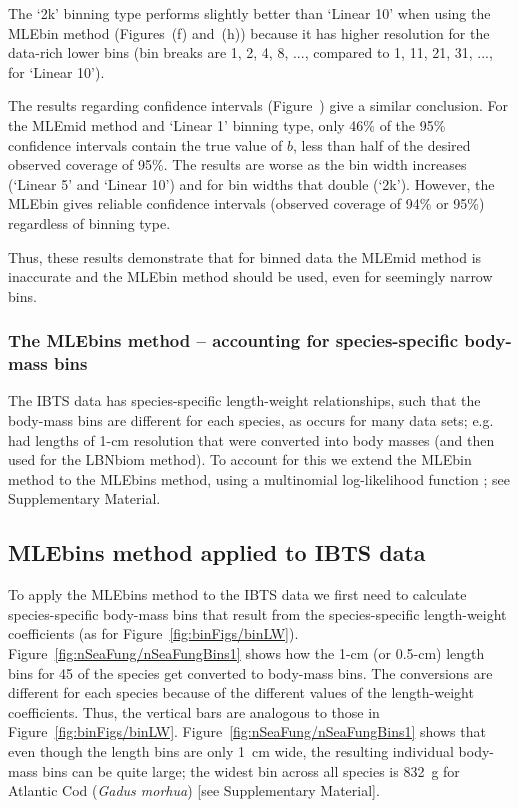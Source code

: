 The `2k' binning type performs slightly better than `Linear 10' when using the
MLEbin method (Figures~\fitMLEhists(f) and~(h)) because it has higher resolution
for the data-rich lower bins (bin breaks are 1, 2, 4, 8, ..., compared to 1, 11,
21, 31, ..., for `Linear 10').

The results regarding confidence intervals (Figure~\fitMLEconfs) give a similar
conclusion. For the MLEmid method and `Linear 1' binning type, only 46\% of the
95\% confidence intervals contain the true value of $b$, less than half of the
desired observed coverage of 95\%. The results are worse as the bin width
increases (`Linear 5' and `Linear 10') and for bin widths that double
(`2k'). However, the MLEbin gives reliable confidence intervals (observed
coverage of 94\% or 95\%) regardless of binning type.

Thus, these results demonstrate that for binned data the MLEmid method is
inaccurate and the MLEbin method should be used, even for seemingly narrow bins.

\subsubsection{The MLEbins method  --  accounting for species-specific body-mass bins}

The IBTS data has species-specific length-weight
relationships, such that the
body-mass bins are different for each species, as occurs for many data sets;
e.g.~\citet{mnwb18} had lengths of 1-cm resolution that were
converted into body masses (and then used for the LBNbiom method).
To account for this we extend the MLEbin
method to the MLEbins method, using a multinomial
log-likelihood function \citep{lawl03}; see Supplementary Material.

\subsection{MLEbins method applied to IBTS data}

To apply the MLEbins method to the IBTS data we first need to calculate
species-specific body-mass bins that result from the species-specific
length-weight coefficients (as for Figure~\ref{fig:binFigs/binLW}).
Figure~\ref{fig:nSeaFung/nSeaFungBins1} shows how the 1-cm (or 0.5-cm) length
bins for 45 of the species get converted to body-mass bins. The conversions are
different for each species because of the different values of the length-weight
coefficients. Thus, the vertical bars are analogous to those in
Figure~\ref{fig:binFigs/binLW}. Figure~\ref{fig:nSeaFung/nSeaFungBins1} shows
that even though the length bins are only 1~cm wide, the resulting individual
body-mass bins can be quite large; the widest bin across all species is 832~g for
Atlantic Cod (\emph{Gadus morhua}) [see Supplementary Material].

